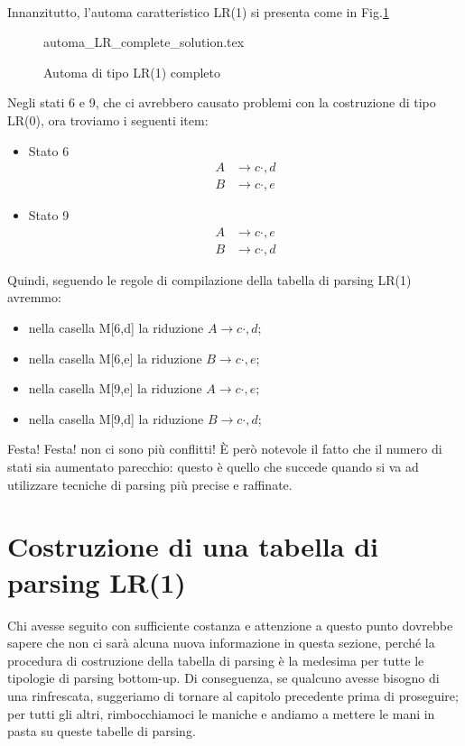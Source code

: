 \documentclass[class=book, crop=false, oneside, 12pt]{standalone}
\begin{document}
\paragraph{}
Innanzitutto, l'automa caratteristico LR(1) si presenta come in Fig.\ref{fig:lr1_automata-complete}
\begin{figure}[H]
    \centering
    {automa_LR_complete_solution.tex}
    \caption{Automa di tipo LR(1) completo}
    \label{fig:lr1_automata-complete}
\end{figure}
Negli stati 6 e 9, che ci avrebbero causato problemi con la costruzione di tipo LR(0), ora troviamo i seguenti item:
\begin{itemize}
    \item Stato 6
    \begin{align*}
        A &\to c \cdot , {d} \\
        B &\to c \cdot , {e}    
    \end{align*}
    \item Stato 9
    \begin{align*}
        A &\to c \cdot , {e} \\
        B &\to c \cdot , {d}    
    \end{align*}
\end{itemize}
 Quindi, seguendo le regole di compilazione della tabella di parsing LR(1) avremmo:
 \begin{itemize}
     \item nella casella M[6,d] la riduzione \(A \to c \cdot , {d}\);
     \item nella casella M[6,e] la riduzione \(B \to c \cdot , {e}\);
     \item nella casella M[9,e] la riduzione \(A \to c \cdot , {e}\);
     \item nella casella M[9,d] la riduzione \(B \to c \cdot , {d}\);
 \end{itemize}
Festa! Festa! non ci sono più conflitti!
È però notevole il fatto che il numero di stati sia aumentato parecchio: questo è quello che succede quando si va ad utilizzare tecniche di parsing più precise e raffinate.

\section{Costruzione di una tabella di parsing LR(1)}
Chi avesse seguito con sufficiente costanza e attenzione a questo punto dovrebbe sapere che non ci sarà alcuna nuova informazione in questa sezione, perché la procedura di costruzione della tabella di parsing è la medesima per tutte le tipologie di parsing bottom-up. Di conseguenza, se qualcuno avesse bisogno di una rinfrescata, suggeriamo di tornare al capitolo precedente prima di proseguire; per tutti gli altri, rimbocchiamoci le maniche e andiamo a mettere le mani in pasta su queste tabelle di parsing.  
\end{document}
